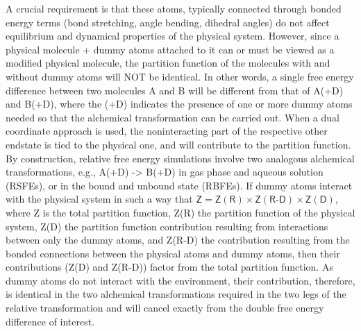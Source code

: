 \documentclass[9pt,bestpractices]{livecoms}
\begin{document}
A crucial requirement is that these atoms, typically connected through bonded energy terms (bond stretching, angle bending, dihedral angles) do not affect equilibrium and dynamical properties of the physical system. However, since a physical molecule + dummy atoms attached to it can or must be viewed as a modified physical molecule, the partition function of the molecules with and without dummy atoms will NOT be identical. In other words, a single free energy difference between two molecules A and B will be different from that of A(+D) and B(+D), where the (+D) indicates the presence of one or more dummy atoms needed so that the alchemical transformation can be carried out. When a dual coordinate approach is used, the noninteracting part of the respective other endstate is tied to the physical one, and will contribute to the partition function. By construction, relative free energy simulations involve two analogous alchemical transformations, e.g., A(+D) -> B(+D) in gas phase and aqueous solution (RSFEs), or in the bound and unbound state (RBFEs). If dummy atoms  interact with the physical system in such a way that $\mathsf{Z = Z(R) \times Z(R\text{-}D) \times Z(D)}$, where Z is the total partition function, Z(R) the partition function of the physical system, Z(D) the partition function contribution resulting from interactions between only the dummy atoms, and Z(R-D) the contribution resulting from the bonded connections between the physical atoms and dummy atoms, then their contributions (Z(D) and Z(R-D)) factor from the total partition function. As dummy atoms do not interact with the environment, their contribution, therefore, is identical in the two alchemical transformations required in the two legs of the relative transformation and will cancel exactly from the double free energy difference of interest.
\end{document}

